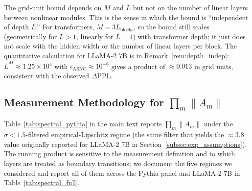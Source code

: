 \documentclass{article}
\theoremstyle{plain}
\theoremstyle{definition}
\theoremstyle{remark}
\begin{document}
The grid-unit bound depends on $M$ and $\bar{L}$ but not on the number of
linear layers between nonlinear modules. This is the sense in which the
bound is ``independent of depth $L$.'' For transformers,
$M = 3 L_{\mathrm{blocks}}$, so the bound still scales (geometrically for
$\bar{L}>1$, linearly for $\bar{L}=1$) with transformer depth; it just does
not scale with the hidden width or the number of linear layers per block.
The quantitative calculation for LLaMA-2 7B is in
Remark~\ref{rem:depth_indep}: $\bar{L}^M\approx 1.25\times 10^4$ with
$\epsilon_{\mathrm{ASNC}}\approx 10^{-6}$ gives a product of $\approx 0.013$
in grid units, consistent with the observed $\Delta\mathrm{PPL}$.

\subsection{Measurement Methodology for $\prod_m\|A_m\|$}
\label{app:spectral_methodology}

Table~\ref{tab:spectral_pythia} in the main text reports
$\prod_m\|A_m\|$ under the $\sigma<1.5$-filtered empirical-Lipschitz regime
(the same filter that yields the $\approx 3.8$ value originally reported
for LLaMA-2 7B in Section~\ref{subsec:exp_assumptions}). The running
product is sensitive to the measurement definition and to which layers
are treated as boundary transitions; we document the five regimes we
considered and report all of them across the Pythia panel and LLaMA-2 7B
in Table~\ref{tab:spectral_full}.
\end{document}
